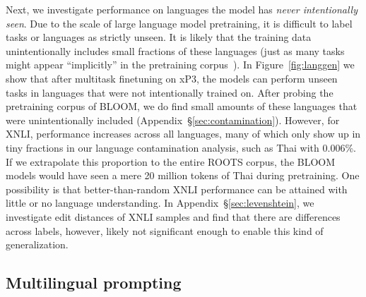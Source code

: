 \documentclass[11pt]{article}
\begin{document}
Next, we investigate performance on languages the model has \textit{never intentionally seen}. Due to the scale of large language model pretraining, it is difficult to label tasks or languages as strictly unseen. It is likely that the training data unintentionally includes small fractions of these languages (just as many tasks might appear ``implicitly'' in the pretraining corpus~\cite{sanh2022multitask}). In Figure~\ref{fig:langgen} we show that after multitask finetuning on xP3, the models can perform unseen tasks in languages that were not intentionally trained on. After probing the pretraining corpus of BLOOM, we do find small amounts of these languages that were unintentionally included (Appendix~\S\ref{sec:contamination}). However, for XNLI, performance increases across all languages, many of which only show up in tiny fractions in our language contamination analysis, such as Thai with 0.006\%. If we extrapolate this proportion to the entire ROOTS corpus, the BLOOM models would have seen a mere 20 million tokens of Thai during pretraining. One possibility is that better-than-random XNLI performance can be attained with little or no language understanding. In Appendix~\S\ref{sec:levenshtein}, we investigate edit distances of XNLI samples and find that there are differences across labels, however, likely not significant enough to enable this kind of generalization.

\subsection{Multilingual prompting}
\label{sec:multilingualprompting}
\end{document}
